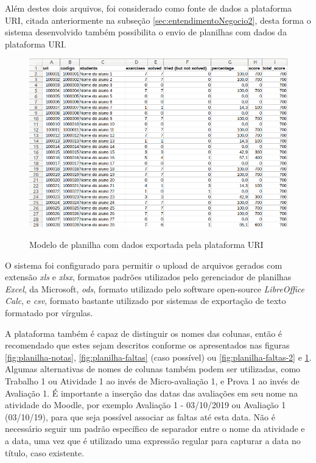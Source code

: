Além destes dois arquivos, foi considerado como fonte de dados a plataforma URI, citada anteriormente na subseção \ref{sec:entendimentoNegocio2}, desta forma o sistema desenvolvido também possibilita o envio de planilhas com dados da plataforma URI.

\begin{figure}[!htb]
    \centering
    \caption{Modelo de planilha com dados exportada pela plataforma URI}
    \includegraphics[height=0.6\textwidth]{./dados/figuras/planilha-uri}
    \label{fig:planilha-uri}
\end{figure}

O sistema foi configurado para permitir o upload de arquivos gerados com extensão \textit{xls} e \textit{xlsx}, formatos padrões utilizados pelo gerenciador de planilhas \textit{Excel}, da Microsoft, \textit{ods}, formato utilizado pelo software open-source \textit{LibreOffice Calc}, e \textit{csv}, formato bastante utilizado por sistemas de exportação de texto formatado por vírgulas.

A plataforma também é capaz de distinguir os nomes das colunas, então é recomendado que estes sejam descritos conforme os apresentados nas figuras \ref{fig:planilha-notas}, \ref{fig:planilha-faltas} (caso possível) ou \ref{fig:planilha-faltas-2} e \ref{fig:planilha-uri}. 
Algumas alternativas de nomes de colunas também podem ser utilizadas, como Trabalho 1 ou Atividade 1 ao invés de Micro-avaliação 1, e Prova 1 ao invés de Avaliação 1. 
É importante a inserção das datas das avaliações em seu nome na atividade do Moodle, por exemplo Avaliação 1 - 03/10/2019 ou Avaliação 1 (03/10/19), para que seja possível associar as faltas até esta data. 
Não é necessário seguir um padrão específico de separador entre o nome da atividade e a data, uma vez que é utilizado uma expressão regular para capturar a data no título, caso existente.

